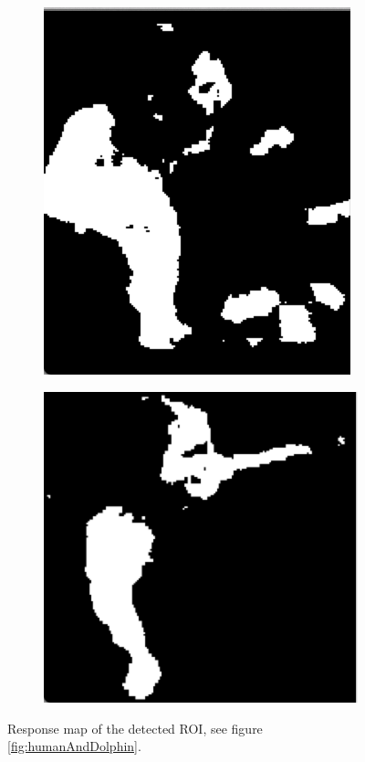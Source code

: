 \begin{figure}[H]
    \centering
    \begin{subfigure}[b]{0.3\textwidth}
    	\centering
			\includegraphics[scale=0.5]{Images/roi_response1.png}
    \end{subfigure}%
    \begin{subfigure}[b]{0.3\textwidth}
    	\centering
			\includegraphics[scale=0.5]{Images/roi_response2.png}
    \end{subfigure}
    \caption{Response map of the detected ROI, see figure \ref{fig:humanAndDolphin}.}
    \label{fig:responsemap}
\end{figure}

